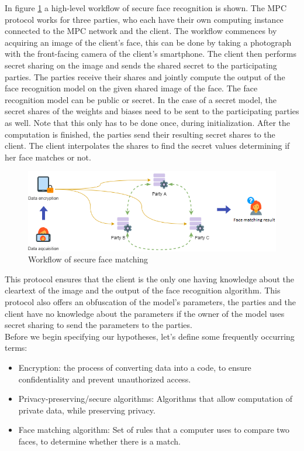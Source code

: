 In figure \ref{fig:workflow} a high-level workflow of secure face recognition is shown. The MPC protocol works for three parties, who each have their own computing instance connected to the MPC network and the client. The workflow commences by acquiring an image of the client's face, this can be done by taking a photograph with the front-facing camera of the client's smartphone. The client then performs secret sharing on the image and sends the shared secret to the participating parties. The parties receive their shares and jointly compute the output of the face recognition model on the given shared image of the face. The face recognition model can be public or secret. In the case of a secret model, the secret shares of the weights and biases need to be sent to the participating parties as well. Note that this only has to be done once, during initialization. After the computation is finished, the parties send their resulting secret shares to the client. The client interpolates the shares to find the secret values determining if her face matches or not.

\begin{figure}[H]
  \includegraphics[width=\linewidth]{fig/workflow.png}
  \caption{Workflow of secure face matching}
  \label{fig:workflow}
\end{figure}

This protocol ensures that the client is the only one having knowledge about the cleartext of the image and the output of the face recognition algorithm. This protocol also offers an obfuscation of the model's parameters, the parties and the client have no knowledge about the parameters if the owner of the model uses secret sharing to send the parameters to the parties.\\

Before we begin specifying our hypotheses, let's define some frequently occurring terms:

\begin{itemize}
  \item Encryption: the process of converting data into a code, to ensure confidentiality and prevent unauthorized access.
  \item Privacy-preserving/secure algorithms: Algorithms that allow computation of private data, while preserving privacy.
  \item Face matching algorithm: Set of rules that a computer uses to compare two faces, to determine whether there is a match.
\end{itemize}

